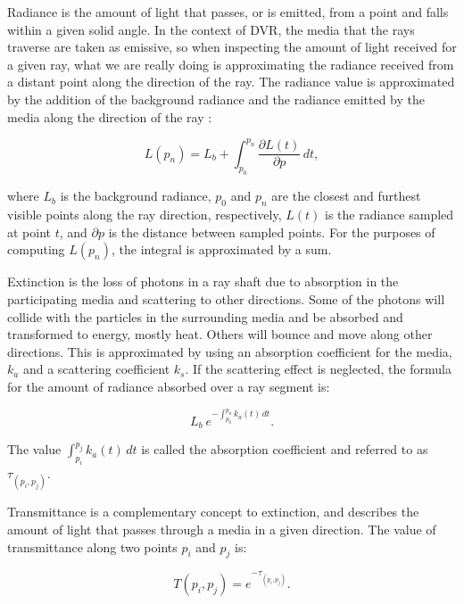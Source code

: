 \documentclass[oneside,a4paper,spanish,links]{amca}
\begin{document}
Radiance is the amount of light that passes, or is emitted, from a
point and falls within a given solid angle. In the context of DVR, the
media that the rays traverse are taken as emissive, so when inspecting
the amount of light received for a given ray, what we are really doing
is approximating the radiance received from a distant point along the
direction of the ray. The radiance value is approximated by the
addition of the background radiance and the radiance emitted by the
media along the direction of the ray \citep{Kratz2006} : 

\begin{equation} \label{eq:general_radiance}  
  L(p_n) = L_b + \int_{p_0}^{p_n} \frac{\partial L(t)}{\partial p} \, dt,
\end{equation}

\noindent where $L_b$ is the background radiance, $p_0$ and $p_n$ are the
closest and furthest visible points along the ray direction,
respectively, $L(t)$ is the radiance sampled at point $t$, and
$\partial p$ is the distance between sampled points. For the purposes
of computing $L(p_n)$, the integral is approximated by a sum.

Extinction is the loss of photons in a ray shaft due to absorption in
the participating media and scattering to other directions. Some of
the photons will collide with the particles in the
surrounding media and be absorbed and transformed to energy, mostly
heat. Others will bounce and move along other directions. This is
approximated by using an absorption coefficient for the media, $k_a$
and a scattering coefficient $k_s$. If the scattering effect is
neglected, the formula for the amount of radiance absorbed over a
ray segment is:

\begin{equation} \label{eq:radiance_absorption}  
    L_b \ \displaystyle e^{-\int_{p_0}^{p_n} k_a(t) \, dt}.
\end{equation}

The value $\int_{p_i}^{p_j} k_a(t) \, dt$ is called the
absorption coefficient and referred to as $\tau_{(p_i, p_j)}$.

Transmittance is a complementary concept to extinction, and describes
the amount of light that passes through a media in a given
direction. The value of transmittance along two points $p_i$ and $p_j$
is:

\begin{equation} \label{eq:general_radiance}  
  T(p_i,p_j) = e^{-\tau_{(p_i, p_j)}}.
\end{equation}
\end{document}
